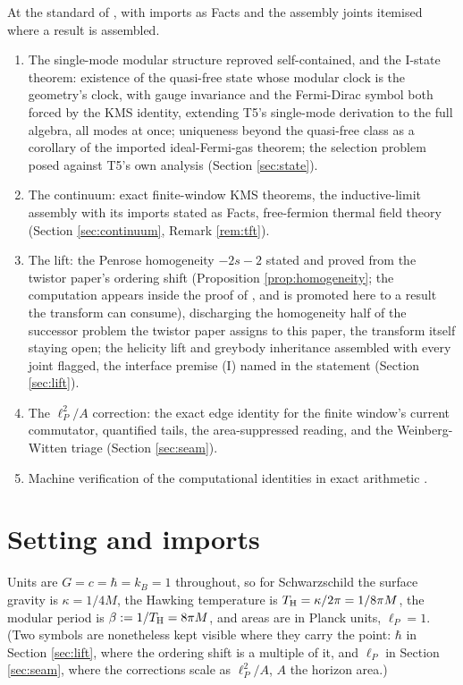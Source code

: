 At the standard of \cite{ButlerT1}, with imports as Facts and the assembly joints itemised where a result is assembled.

\begin{enumerate}
\item The single-mode modular structure reproved self-contained, and the I-state theorem: existence of the quasi-free state whose modular clock is the geometry's clock, with gauge invariance and the Fermi-Dirac symbol both forced by the KMS identity, extending T5's single-mode derivation \cite[Thm.~7.20]{ButlerT5} to the full algebra, all modes at once; uniqueness beyond the quasi-free class as a corollary of the imported ideal-Fermi-gas theorem; the selection problem posed against T5's own analysis (Section \ref{sec:state}).
\item The continuum: exact finite-window KMS theorems, the inductive-limit assembly with its imports stated as Facts, free-fermion thermal field theory (Section \ref{sec:continuum}, Remark \ref{rem:tft}).
\item The lift: the Penrose homogeneity $-2s-2$ stated and proved from the twistor paper's ordering shift (Proposition \ref{prop:homogeneity}; the computation appears inside the proof of \cite[Thm.~5.7]{ButlerT9}, and is promoted here to a result the transform can consume), discharging the homogeneity half of the successor problem the twistor paper assigns to this paper, the transform itself staying open; the helicity lift and greybody inheritance assembled with every joint flagged, the interface premise (I) named in the statement (Section \ref{sec:lift}).
\item The $\ell_P^2/A$ correction: the exact edge identity for the finite window's current commutator, quantified tails, the area-suppressed reading, and the Weinberg-Witten triage (Section \ref{sec:seam}).
\item Machine verification of the computational identities in exact arithmetic \cite{ButlerVerifyT7}.
\end{enumerate}

\section{Setting and imports}\label{sec:setting}

Units are $G = c = \hbar = k_B = 1$ throughout, so for Schwarzschild the surface gravity is $\kappa = 1/4M$, the Hawking temperature is $T_{\mathrm{H}} = \kappa/2\pi = 1/8\pi M$, the modular period is $\beta := 1/T_{\mathrm{H}} = 8\pi M$, and areas are in Planck units, $\ell_P = 1$. (Two symbols are nonetheless kept visible where they carry the point: $\hbar$ in Section \ref{sec:lift}, where the ordering shift is a multiple of it, and $\ell_P$ in Section \ref{sec:seam}, where the corrections scale as $\ell_P^2/A$, $A$ the horizon area.)

